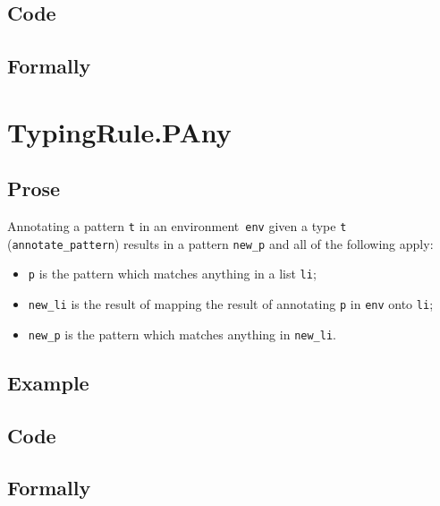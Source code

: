 \documentclass{book}
\begin{document}
  \subsection{Code}

\begin{emptyformal}
    \subsection{Formally}
\end{emptyformal}


\section{TypingRule.PAny\label{sec:TypingRule.PAny}}

  \subsection{Prose}
   Annotating a pattern \texttt{t} in an environment~\texttt{env} given a type \texttt{t} (\texttt{annotate\_pattern}) results in a pattern \texttt{new\_p} and all of the following apply:
   \begin{itemize}
   \item \texttt{p} is the pattern which matches anything in a list \texttt{li};
   \item \texttt{new\_li} is the result of mapping the result of annotating \texttt{p} in \texttt{env} onto \texttt{li};
   \item \texttt{new\_p} is the pattern which matches anything in \texttt{new\_li}.
   \end{itemize}

  \subsection{Example}

  \subsection{Code}

\begin{emptyformal}
    \subsection{Formally}
\end{emptyformal}
\end{document}
